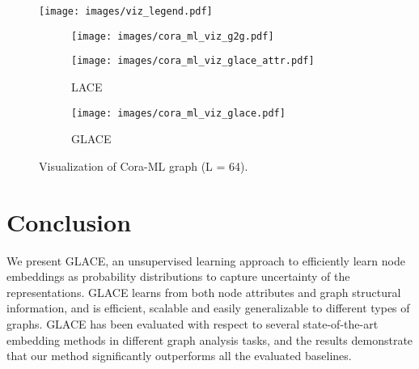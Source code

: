 \documentclass[runningheads]{llncs}
\begin{document}
\begin{figure}[h]
    \begin{minipage}{\textwidth}
        \centering
        \texttt{[image: images/viz\_legend.pdf]}
    \end{minipage}
    \begin{minipage}{\textwidth}
        \centering
        \begin{subfigure}{0.24\textwidth}
            \texttt{[image: images/cora\_ml\_viz\_g2g.pdf]}
            \label{fig:g2g}
        \end{subfigure}
        \begin{subfigure}{0.24\textwidth}
            \texttt{[image: images/cora\_ml\_viz\_glace\_attr.pdf]} 
            \caption{\small LACE}
            \label{fig:glace_1}
        \end{subfigure}
        \begin{subfigure}{0.24\textwidth}
            \texttt{[image: images/cora\_ml\_viz\_glace.pdf]} 
            \caption{\small GLACE}
            \label{fig:glace_2}
        \end{subfigure}
    \end{minipage}
    \caption{\small Visualization of Cora-ML graph (L = 64).}
    \label{fig:cora_ml_viz}
    \vspace{-5mm}
\end{figure}
 \section{Conclusion}

We present GLACE, an unsupervised learning approach to efficiently learn node embeddings as probability distributions to capture uncertainty of the representations. GLACE learns from both node attributes and graph structural information, and is efficient, scalable and easily generalizable to different types of graphs. GLACE has been evaluated with respect to several state-of-the-art embedding methods in different graph analysis tasks, and the results demonstrate that our method significantly outperforms all the evaluated baselines. 
 


\end{document}
